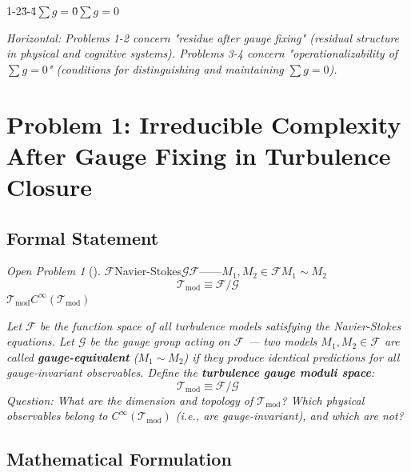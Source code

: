 \documentclass[12pt,a4paper]{article}
\theoremstyle{remark}
\newtheorem{openproblem}[theorem]{Open Problem}
\newcommand{\G}{\mathcal{G}}
\newcommand{\T}{\mathcal{T}}
\newcommand{\F}{\mathcal{F}}
\begin{document}
\textbf{}1-2\"\"3-4\"$\sum g = 0$\"$\sum g = 0$

\medskip
\noindent\textit{Horizontal: Problems 1-2 concern "residue after gauge fixing" (residual structure in physical and cognitive systems). Problems 3-4 concern "operationalizability of $\sum g = 0$" (conditions for distinguishing and maintaining $\sum g = 0$).}

\newpage


\section{}
\section*{Problem 1: Irreducible Complexity After Gauge Fixing in Turbulence Closure}

\subsection{ Formal Statement}

\begin{openproblem}[]
\label{prob:turbulence}
$\F$Navier-Stokes$\G$$\F$——$M_1, M_2 \in \F$\textbf{}$M_1 \sim M_2$\textbf{}
\begin{equation}
    \T_{\text{mod}} \equiv \F / \G
\end{equation}
$\T_{\text{mod}}$$C^\infty(\T_{\text{mod}})$
\end{openproblem}

\medskip
\noindent\textit{Let $\F$ be the function space of all turbulence models satisfying the Navier-Stokes equations. Let $\G$ be the gauge group acting on $\F$ — two models $M_1, M_2 \in \F$ are called \textbf{gauge-equivalent} ($M_1 \sim M_2$) if they produce identical predictions for all gauge-invariant observables. Define the \textbf{turbulence gauge moduli space}:}
\begin{equation}
    \T_{\text{mod}} \equiv \F / \G
\end{equation}
\textit{Question: What are the dimension and topology of $\T_{\text{mod}}$? Which physical observables belong to $C^\infty(\T_{\text{mod}})$ (i.e., are gauge-invariant), and which are not?}

\subsection{ Mathematical Formulation}
\end{document}
